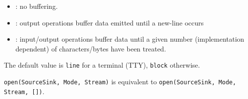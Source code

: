 \begin{itemize}
\begin{itemize}

\item {}: no buffering.

\item {}: output operations buffer data emitted until a new-line
occurs

\item {}: input/output operations buffer data until a given
number (implementation dependent) of characters/bytes have been treated.

\end{itemize}

The default value is \texttt{line} for a terminal (TTY), \texttt{block}
otherwise.

\end{itemize}

\texttt{open(SourceSink, Mode, Stream)} is equivalent to
\texttt{open(SourceSink, Mode, Stream, [])}.

